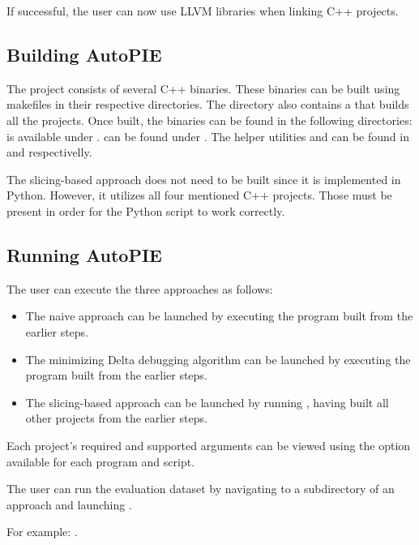 \documentclass[12pt,a4paper]{report}
\let\openright=\clearpage
\begin{document}
If successful, the user can now use LLVM libraries when linking C++ projects.

\subsection{Building AutoPIE}

The project consists of several C++ binaries. 
These binaries can be built using makefiles in their respective directories. 
The  directory also contains a  that builds 
all the projects. 
Once built, the binaries can be found in the following directories:
 is available under 
.
 can be found under 
.
The helper utilities  and  can 
be found in 
and  
respectivelly.

The slicing-based approach does not need to be built since it is implemented 
in Python. 
However, it utilizes all four mentioned C++ projects. 
Those must be present in order for the Python script to work correctly.

\subsection{Running AutoPIE}

The user can execute the three approaches as follows:

\begin{itemize}
  \item The naive approach can be launched by executing 
  the  program built from the earlier steps.
  \item The minimizing Delta debugging algorithm can be launched by 
  executing the  program built from the earlier steps.
  \item The slicing-based approach can be launched by running 
  , having 
  built all other projects from the earlier steps.
\end{itemize}

Each project's required and supported arguments can be viewed using 
the  option available for each program and script.

The user can run the evaluation dataset by navigating to a subdirectory of 
an approach and launching . 

For example: .

\openright
\end{document}
